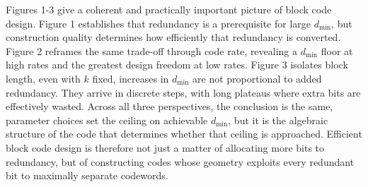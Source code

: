 \documentclass{article}
\begin{document}
Figures 1-3 give a coherent and practically important picture of block code design. Figure 1 establishes that 
redundancy is a prerequisite for large \(d_\text{min}\), but construction quality determines how efficiently that 
redundancy is converted. Figure 2 reframes the same trade-off through code rate, revealing a \(d_\text{min}\)
floor at high rates and the greatest design freedom at low rates. Figure 3 isolates block length, even with \(k\) fixed,
increases in \(d_\text{min}\) are not proportional to added redundancy. They arrive in discrete steps, with long 
plateaus where extra bits are effectively wasted. Across all three perspectives, the conclusion is the same, parameter 
choices set the ceiling on achievable \(d_\text{min}\), but it is the algebraic structure of the code that determines 
whether that ceiling is approached. Efficient block code design is therefore not just a matter of allocating more 
bits to redundancy, but of constructing codes whose geometry exploits every redundant bit to maximally separate 
codewords.

\newpage
\centering
\printbibliography

\appendix
\end{document}
